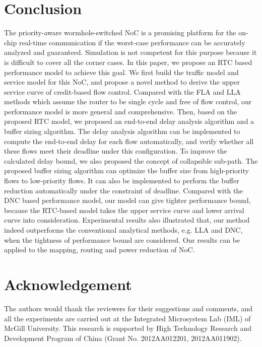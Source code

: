 \documentclass[10pt,journal]{IEEEtran}
\begin{document}
\section{Conclusion}\label{conclusion}
The priority-aware wormhole-switched NoC is a promising platform for the on-chip real-time communication if the worst-case performance can be accurately analyzed and guaranteed. Simulation is not competent for this purpose because it is difficult to cover all the corner cases. In this paper, we propose an RTC based performance model to achieve this goal. We first build the traffic model and service model for this NoC, and propose a novel method to derive the upper service curve of credit-based flow control. Compared with the FLA and LLA methods which assume the router to be single cycle and free of flow control, our performance model is more general and comprehensive. Then, based on the proposed RTC model, we proposed an end-to-end delay analysis algorithm and a buffer sizing algorithm. The delay analysis algorithm can be implemented to compute the end-to-end delay for each flow automatically, and verify whether all these flows meet their deadline under this configuration. To improve the calculated delay bound, we also proposed the concept of collapsible sub-path. The proposed buffer sizing algorithm can optimize the buffer size from high-priority flows to low-priority flows. It can also be implemented to perform the buffer reduction automatically under the constraint of deadline. Compared with the DNC based performance model, our model can give tighter performance bound, because the RTC-based model takes the upper service curve and lower arrival curve into consideration. Experimental results also illustrated that, our method indeed outperforms the conventional analytical methods, e.g. LLA and DNC, when the tightness of performance bound are considered. Our results can be applied to the mapping, routing and power reduction of NoC.

\section*{Acknowledgement}
The authors would thank the reviewers for their suggestions and comments, and all the experiments are carried out at the Integrated Microsystem Lab (IML) of McGill University. This research is supported by High Technology Research and Development Program of China (Grant No. 2012AA012201, 2012AA011902).



\end{document}
